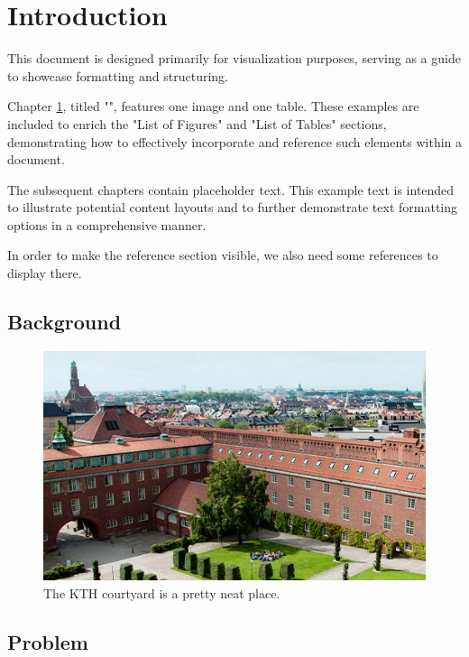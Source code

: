 \chapter{Introduction}

\label{ch:introduction}

This document is designed primarily for visualization purposes, serving as a guide to showcase formatting and structuring. 

Chapter \ref{ch:introduction}, titled "", features one image  and one table. These examples are included to enrich the "List of Figures" and "List of Tables" sections, demonstrating how to effectively incorporate and reference such elements within a document. 

The subsequent chapters contain placeholder text. This example text is intended to illustrate potential content layouts and to further demonstrate text formatting options in a comprehensive manner.

In order to make the reference section visible, we also need some references \cite{liu2017} to display there\cite{jones2017,liu2017}.

\section{Background}

\begin{figure}
    \includegraphics[width=\linewidth]{images/kth-courtyard.jpg}
    \caption{The KTH courtyard is a pretty neat place.}
    \label{fig:kth-courtyard}
\end{figure}

\lipsum[2]

\section{Problem}

